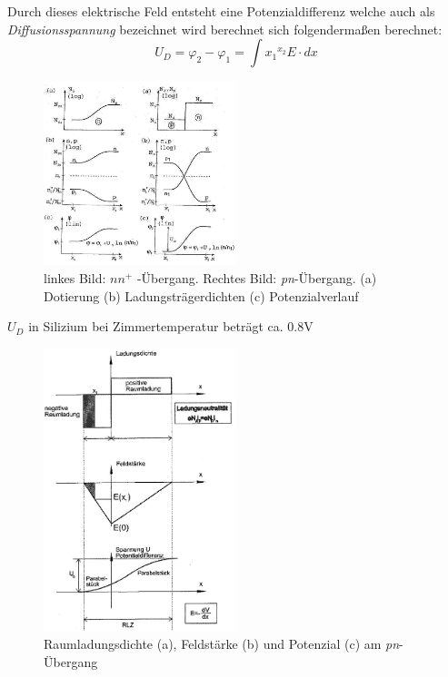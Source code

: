 \documentclass{article}
\begin{document}
    Durch dieses elektrische Feld entsteht eine Potenzialdifferenz welche auch als \textit{Diffusionsspannung} bezeichnet wird berechnet sich folgendermaßen berechnet:
    \begin{equation}
        U_D = \varphi_2 - \varphi_1 = \int{x_1}^{x_2} E \cdot dx
    \end{equation}

           \begin{figure}[H]
        \centering
        \includegraphics[width=0.5\textwidth]{fig/pnuebergang.jpg}
        \caption{linkes Bild: $nn^+$ -Übergang. Rechtes Bild: \textit{pn}-Übergang. (a) Dotierung (b) Ladungsträgerdichten (c) Potenzialverlauf}
        \label{fig:pnuebergang}
    \end{figure}
    
	$U_D$ in Silizium bei Zimmertemperatur beträgt ca. 0.8V 
    \begin{figure}[H]
        \centering
        \includegraphics[width=0.5\textwidth]{fig/raumladungszone}
        \caption{Raumladungsdichte (a), Feldstärke (b) und Potenzial (c) am \textit{pn}-Übergang}
        \label{fig:raumladungszone}
    \end{figure}
    
\end{document}
